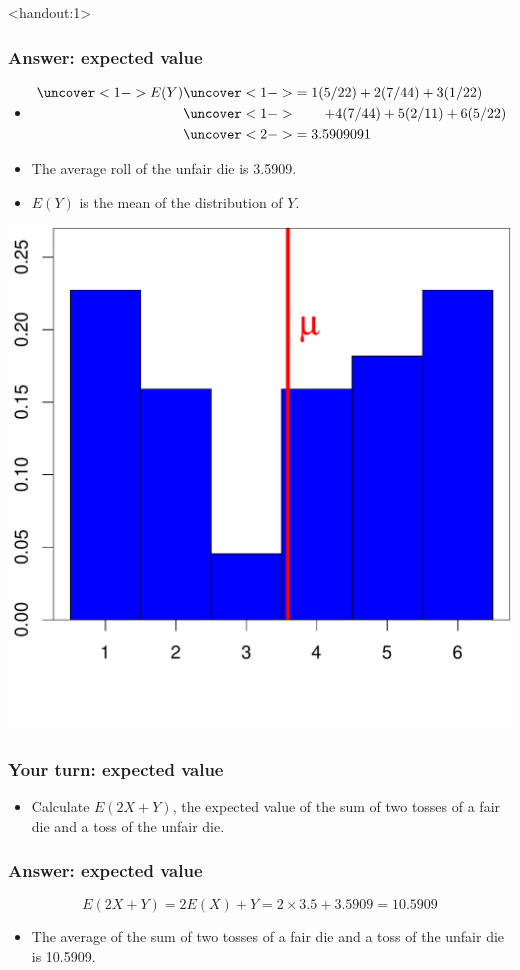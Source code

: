 \documentclass[handout]{beamer}\usepackage[]{graphicx}\usepackage[]{color}
\newenvironment{knitrout}{}{} %
\newcommand{\answers}{1}
\numberwithin{equation}{section}
\begin{document}
\begin{frame}<handout:\answers>
\frametitle{Answer: expected value}\scriptsize
\begin{itemize}
\item 
\begin{align*}
\uncover<1->{E(Y)} & \uncover<1->{= 1 (5/22) + 2(7/44) + 3 (1/22)} \\
&\uncover<1->{ \qquad + 4(7/44) + 5(2/11) + 6(5/22)} \\
&\uncover<2->{ = 3.5909091}
\end{align*}
\pause \pause \item The average roll of the unfair die is 3.5909.
\pause \item $E(Y)$ is the  mean of the distribution of $Y$.
\end{itemize}

\begin{center}
\begin{knitrout}
\color{fgcolor}
\includegraphics[width=.4\textwidth,height=.4\textheight]{figure/unnamed-chunk-8-1} 

\end{knitrout}
\end{center}
\end{frame}


\begin{frame}[t]
\frametitle{Your turn: expected value}
\begin{itemize}
\item
Calculate $E(2X + Y)$, the expected value of the sum of two tosses of a fair die and a toss of the unfair die. 
\end{itemize}
\end{frame}

\begin{frame}[t]
\frametitle{Answer: expected value}

\[E(2X + Y) = 2E(X) + Y = 2\times 3.5 + 3.5909 = 10.5909\]
\begin{itemize}
\item
The average of the sum of two tosses of a fair die and a toss of the unfair die is 10.5909.
\end{itemize}

\end{frame}
\end{document}
